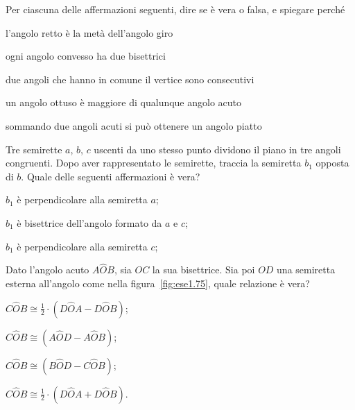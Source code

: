 \begin{esercizio}
\label{ese:1.73}
Per ciascuna delle affermazioni seguenti, dire se è vera o falsa, e 
spiegare perché
\begin{enumeratea}
\item l'angolo retto è la metà dell'angolo giro	
\tab\tab\tab\qquad\boxV\quad\boxF
\item ogni angolo convesso ha due bisettrici		
\tab\tab\tab\qquad\boxV\quad\boxF
\item due angoli che hanno in comune il vertice sono 
consecutivi	\tab\qquad\boxV\quad\boxF
\item un angolo ottuso è maggiore di qualunque angolo acuto	
	\tab\qquad\boxV\quad\boxF
\item sommando due angoli acuti si può ottenere un angolo 
piatto	\tab\qquad\boxV\quad\boxF
\end{enumeratea}
\end{esercizio}

\begin{esercizio}
\label{ese:1.74}
Tre semirette $a$, $b$, $c$ uscenti da uno stesso punto dividono il 
piano in tre angoli congruenti. Dopo aver rappresentato le semirette, 
traccia la semiretta $b_1$ opposta di $b$. Quale delle seguenti 
affermazioni è vera?
\begin{enumeratea}
\item $b_1$ è perpendicolare alla semiretta $a$;
\item $b_1$ è bisettrice dell'angolo formato da $a$ e $c$;
\item $b_1$ è perpendicolare alla semiretta $c$;
\end{enumeratea}
\end{esercizio}

\begin{esercizio}
\label{ese:1.75}
Dato l'angolo acuto $A\widehat{O}B$, sia $OC$ la sua bisettrice. Sia 
poi $OD$ una semiretta esterna all'angolo come nella 
figura~\ref{fig:ese1.75}, quale relazione è vera?
\begin{multicols}{2}
\begin{enumeratea}
\item $C\widehat{O}B\cong 
\frac{1}{2}\cdot(D\widehat{O}A-D\widehat{O}B)$;
\item $C\widehat{O}B\cong (A\widehat{O}D-A\widehat{O}B)$;
\item $C\widehat{O}B\cong (B\widehat{O}D-C\widehat{O}B)$;
\item $C\widehat{O}B\cong 
\frac{1}{2}\cdot(D\widehat{O}A+D\widehat{O}B)$.
\end{enumeratea}
\end{multicols}
\end{esercizio}



